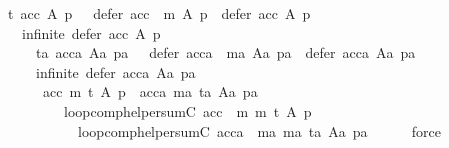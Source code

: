\begin{isabellebody}
\ \ \ \ \ \ \ {\isasymnot}\ {\isacharparenleft}{\kern0pt}t\ {\isacharparenleft}{\kern0pt}acc\ A\ p{\isacharparenright}{\kern0pt}\ {\isasymor}\ {\isasymnot}\ defer\ {\isacharparenleft}{\kern0pt}acc\ {\isasymtriangleright}\ m{\isacharparenright}{\kern0pt}\ A\ p\ {\isasymsubset}\ defer\ acc\ A\ p\ {\isasymor}\isanewline
\ \ \ \ \ \ \ \ \ \ infinite\ {\isacharparenleft}{\kern0pt}defer\ acc\ A\ p{\isacharparenright}{\kern0pt}{\isacharparenright}{\kern0pt}\ {\isasymLongrightarrow}\isanewline
\ \ \ \ \ \ \ \ \ \ \ {\isasymnot}\ {\isacharparenleft}{\kern0pt}ta\ {\isacharparenleft}{\kern0pt}acca\ Aa\ pa{\isacharparenright}{\kern0pt}\ {\isasymor}\ {\isasymnot}\ defer\ {\isacharparenleft}{\kern0pt}acca\ {\isasymtriangleright}\ ma{\isacharparenright}{\kern0pt}\ Aa\ pa\ {\isasymsubset}\ defer\ acca\ Aa\ pa\ {\isasymor}\isanewline
\ \ \ \ \ \ \ \ \ \ \ \ infinite\ {\isacharparenleft}{\kern0pt}defer\ acca\ Aa\ pa{\isacharparenright}{\kern0pt}{\isacharparenright}{\kern0pt}\ {\isasymLongrightarrow}\isanewline
\ \ \ \ \ \ \ \ \ \ \ \ \ {\isacharparenleft}{\kern0pt}acc{\isacharcomma}{\kern0pt}\ m{\isacharcomma}{\kern0pt}\ t{\isacharcomma}{\kern0pt}\ A{\isacharcomma}{\kern0pt}\ p{\isacharparenright}{\kern0pt}\ {\isacharequal}{\kern0pt}\ {\isacharparenleft}{\kern0pt}acca{\isacharcomma}{\kern0pt}\ ma{\isacharcomma}{\kern0pt}\ ta{\isacharcomma}{\kern0pt}\ Aa{\isacharcomma}{\kern0pt}\ pa{\isacharparenright}{\kern0pt}\ {\isasymLongrightarrow}\isanewline
\ \ \ \ \ \ \ \ \ \ \ \ \ \ \ \ loop{\isacharunderscore}{\kern0pt}comp{\isacharunderscore}{\kern0pt}helper{\isacharunderscore}{\kern0pt}sumC\ {\isacharparenleft}{\kern0pt}acc\ {\isasymtriangleright}\ m{\isacharcomma}{\kern0pt}\ m{\isacharcomma}{\kern0pt}\ t{\isacharcomma}{\kern0pt}\ A{\isacharcomma}{\kern0pt}\ p{\isacharparenright}{\kern0pt}\ {\isacharequal}{\kern0pt}\isanewline
\ \ \ \ \ \ \ \ \ \ \ \ \ \ \ \ \ \ loop{\isacharunderscore}{\kern0pt}comp{\isacharunderscore}{\kern0pt}helper{\isacharunderscore}{\kern0pt}sumC\ {\isacharparenleft}{\kern0pt}acca\ {\isasymtriangleright}\ ma{\isacharcomma}{\kern0pt}\ ma{\isacharcomma}{\kern0pt}\ ta{\isacharcomma}{\kern0pt}\ Aa{\isacharcomma}{\kern0pt}\ pa{\isacharparenright}{\kern0pt}{\isachardoublequoteclose}\isanewline
\ \ \ \ \isamarkupfalse%
\ force\isanewline
{}\isamarkupfalse%
%
\endisatagproof
{\isafoldproof}%
%
\isadelimproof
\isanewline
%
\endisadelimproof
{}\isamarkupfalse%
\isanewline
%
\isadelimproof
%
\endisadelimproof
%
\isatagproof
{}\isamarkupfalse%
\ {\isacharminus}{\kern0pt}\isanewline
\ \ \isamarkupfalse%

\end{isabellebody}
